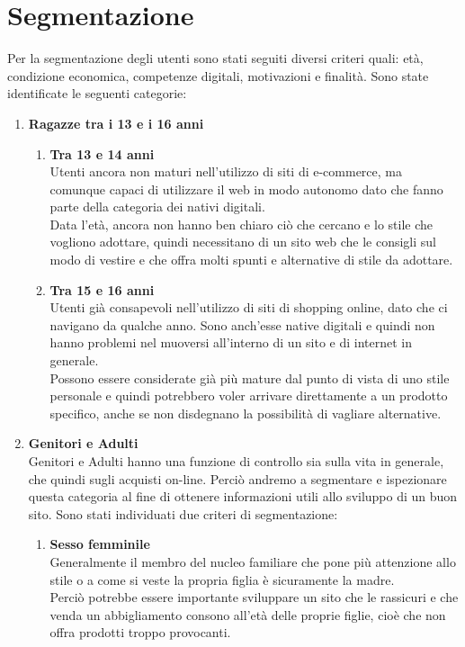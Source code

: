 \documentclass[12pt,a4paper]{report}
\begin{document}
\section{Segmentazione}
Per la segmentazione degli utenti sono stati seguiti diversi criteri quali:
 età, condizione economica, competenze digitali, motivazioni e finalità.
\newpage
Sono state identificate le seguenti categorie:
 \begin{enumerate}
   \item \textbf{Ragazze tra i 13 e i 16 anni}
   \begin{enumerate}[label=\alph*.]
     \item \textbf{Tra 13 e 14 anni}\\
     Utenti ancora non maturi nell'utilizzo di siti di e-commerce, ma comunque capaci di utilizzare il web in modo autonomo dato che fanno parte della categoria dei nativi digitali.\\
     Data l'età, ancora non hanno ben chiaro ciò che cercano e lo stile che vogliono adottare, quindi necessitano di un sito web che le consigli sul modo di vestire e che offra molti spunti e alternative di stile da adottare.
     \item \textbf{Tra 15 e 16 anni}\\
     Utenti già consapevoli nell'utilizzo di siti di shopping online, dato che ci navigano da qualche anno. Sono anch'esse native digitali e quindi non hanno problemi nel muoversi all'interno di un sito e di internet in generale.\\
     Possono essere considerate già più mature dal punto di vista di uno stile personale e quindi potrebbero voler arrivare direttamente a un prodotto specifico, anche se non disdegnano la possibilità di vagliare alternative.
   \end{enumerate}
   \item \textbf{Genitori e Adulti}\\
   Genitori e Adulti hanno una funzione di controllo sia sulla vita in generale, che quindi sugli acquisti on-line. Perciò andremo a segmentare e ispezionare questa categoria al fine di ottenere informazioni utili allo sviluppo di un buon sito.
   Sono stati individuati due criteri di segmentazione:
   \begin{enumerate}[label=\alph*.]
   \item \textbf{Sesso femminile}\\
   Generalmente il membro del nucleo familiare che pone più attenzione allo stile o a come si veste la propria figlia è sicuramente la madre.\\ Perciò potrebbe essere importante sviluppare un sito che le rassicuri e che venda un abbigliamento consono all'età delle proprie figlie, cioè che non offra prodotti troppo provocanti.

\end{enumerate}
\end{enumerate}
\end{document}
